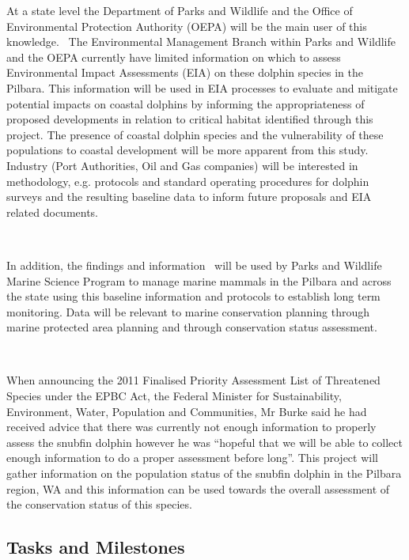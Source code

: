 \documentclass[version=last,
    paper=a4,                               %
    10pt,                                   %
    dvipsnames,
    oneside,                              %
    headings=openany,                       %
    open=any,
    BCOR=7mm,                               %
    DIV=15,     %
]{scrbook}
\begin{document}
At a state level the Department of Parks and Wildlife and the Office of
Environmental Protection Authority (OEPA) will be the main user of this
knowledge. ~The Environmental Management Branch within Parks and
Wildlife and the OEPA currently have limited information on which to
assess Environmental Impact Assessments (EIA) on these dolphin species
in the Pilbara. This information will be used in EIA processes to
evaluate and mitigate potential impacts on coastal dolphins by informing
the appropriateness of proposed developments in relation to critical
habitat identified through this project. The presence of coastal dolphin
species and the vulnerability of these populations to coastal
development will be more apparent from this study.~ Industry (Port
Authorities, Oil and Gas companies) will be interested in methodology,
e.g. protocols and standard operating procedures for dolphin surveys and
the resulting baseline data to inform future proposals and EIA related
documents.

~

In addition, the findings and information ~will be used by Parks and
Wildlife Marine Science Program to manage marine mammals in the Pilbara
and across the state using this baseline information and protocols to
establish long term monitoring. Data will be relevant to marine
conservation planning through marine protected area planning and through
conservation status assessment. ~

~

When announcing the 2011 Finalised Priority Assessment List of
Threatened Species under the EPBC Act, the Federal Minister for
Sustainability, Environment, Water, Population and Communities, Mr Burke
said he had received advice that there was currently not enough
information to properly assess the snubfin dolphin however he was
``hopeful that we will be able to collect enough information to do a
proper assessment before long''. This project will gather information on
the population status of the snubfin dolphin in the Pilbara region, WA
and this information can be used towards the overall assessment of the
conservation status of this species.




\subsection*{Tasks and Milestones}

~
\end{document}
